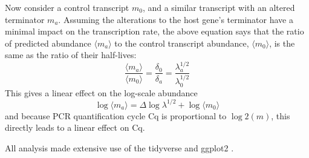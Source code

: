 \documentclass[../main.tex]{subfiles}
\begin{document}
Now consider a control transcript \(m_0\), and a similar transcript with an altered terminator \(m_a\). Assuming the alterations to the host gene's terminator have a minimal impact on the transcription rate, the above equation says that the ratio of predicted abundance \(\langle m_a \rangle\) to the control transcript abundance, \(\langle m_0 \rangle\), is the same as the ratio of their half-lives:
\[\frac{\langle m_a \rangle}{\langle m_0 \rangle} = \frac{\delta_0}{\delta_a} =\frac{\lambda^{1/2}_a}{\lambda^{1/2}_0}\]
This gives a linear effect on the log-scale abundance
\[\log\langle m_a \rangle =\Delta \log\lambda^{1/2} + \log\langle m_0 \rangle\]
and because PCR quantification cycle Cq is proportional to \(\log2(m)\), this directly leads to a linear effect on Cq.

All analysis made extensive use of the tidyverse and ggplot2 \parencite{Wickham2016, Wickham2019}.
\end{document}
